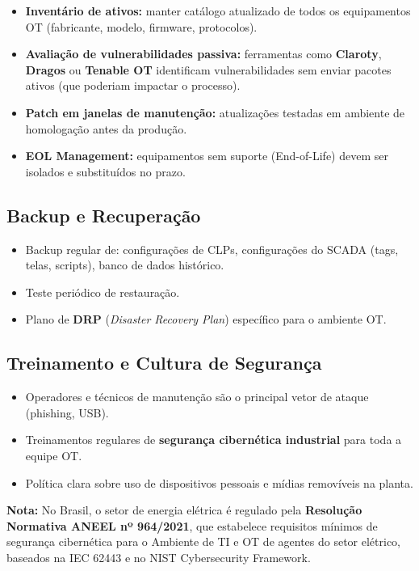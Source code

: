 \begin{itemize}
\tightlist
\item
  \textbf{Inventário de ativos:} manter catálogo atualizado de todos os equipamentos OT (fabricante, modelo, firmware, protocolos).
\item
  \textbf{Avaliação de vulnerabilidades passiva:} ferramentas como \textbf{Claroty}, \textbf{Dragos} ou \textbf{Tenable OT} identificam vulnerabilidades sem enviar pacotes ativos (que poderiam impactar o processo).
\item
  \textbf{Patch em janelas de manutenção:} atualizações testadas em ambiente de homologação antes da produção.
\item
  \textbf{EOL Management:} equipamentos sem suporte (End-of-Life) devem ser isolados e substituídos no prazo.
\end{itemize}

\subsection{Backup e Recuperação}\label{backup-e-recuperauxe7uxe3o}

\begin{itemize}
\tightlist
\item
  Backup regular de: configurações de CLPs, configurações do SCADA (tags, telas, scripts), banco de dados histórico.
\item
  Teste periódico de restauração.
\item
  Plano de \textbf{DRP} (\emph{Disaster Recovery Plan}) específico para o ambiente OT.
\end{itemize}

\subsection{Treinamento e Cultura de Segurança}\label{treinamento-e-cultura-de-seguranuxe7a}

\begin{itemize}
\tightlist
\item
  Operadores e técnicos de manutenção são o principal vetor de ataque (phishing, USB).
\item
  Treinamentos regulares de \textbf{segurança cibernética industrial} para toda a equipe OT.
\item
  Política clara sobre uso de dispositivos pessoais e mídias removíveis na planta.
\end{itemize}

\begin{caixanota}

\textbf{Nota:} No Brasil, o setor de energia elétrica é regulado pela \textbf{Resolução Normativa ANEEL nº 964/2021}, que estabelece requisitos mínimos de segurança cibernética para o Ambiente de TI e OT de agentes do setor elétrico, baseados na IEC 62443 e no NIST Cybersecurity Framework.

\end{caixanota}

